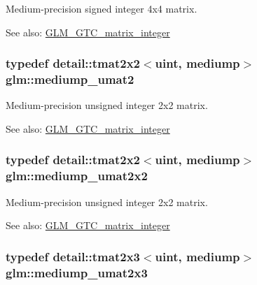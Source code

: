 Medium-precision signed integer 4x4 matrix. \begin{Desc}
\item[See also:]\hyperlink{group__gtc__matrix__integer}{GLM\_\-GTC\_\-matrix\_\-integer} \end{Desc}
\hypertarget{group__gtc__matrix__integer_g388a5b9d7e494d5f5bd30b9e11ded06a}{
\subsubsection[mediump\_\-umat2]{\setlength{\rightskip}{0pt plus 5cm}typedef detail::tmat2x2$<$uint, mediump$>$ {\bf glm::mediump\_\-umat2}}}
\label{group__gtc__matrix__integer_g388a5b9d7e494d5f5bd30b9e11ded06a}


Medium-precision unsigned integer 2x2 matrix. \begin{Desc}
\item[See also:]\hyperlink{group__gtc__matrix__integer}{GLM\_\-GTC\_\-matrix\_\-integer} \end{Desc}
\hypertarget{group__gtc__matrix__integer_g80e478f09c6caa16410198ce78fe8a2b}{
\subsubsection[mediump\_\-umat2x2]{\setlength{\rightskip}{0pt plus 5cm}typedef detail::tmat2x2$<$uint, mediump$>$ {\bf glm::mediump\_\-umat2x2}}}
\label{group__gtc__matrix__integer_g80e478f09c6caa16410198ce78fe8a2b}


Medium-precision unsigned integer 2x2 matrix. \begin{Desc}
\item[See also:]\hyperlink{group__gtc__matrix__integer}{GLM\_\-GTC\_\-matrix\_\-integer} \end{Desc}
\hypertarget{group__gtc__matrix__integer_gaae45c5dbaad1ecd57bfa936d851be1b}{
\subsubsection[mediump\_\-umat2x3]{\setlength{\rightskip}{0pt plus 5cm}typedef detail::tmat2x3$<$uint, mediump$>$ {\bf glm::mediump\_\-umat2x3}}}
\label{group__gtc__matrix__integer_gaae45c5dbaad1ecd57bfa936d851be1b}


